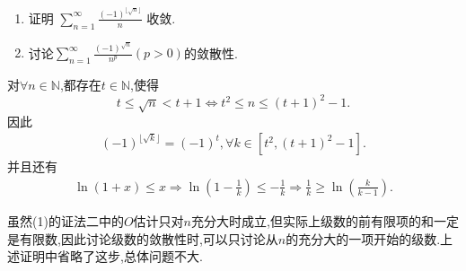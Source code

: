 \documentclass[../../main.tex]{subfiles}%
\begin{document}
\begin{example}
\begin{enumerate}[(1)]
\item 证明 $\sum_{n=1}^{\infty} \frac{(-1)^{\lfloor \sqrt{n} \rfloor}}{n}$ 收敛.

\item 讨论$\sum_{n=1}^{\infty}{\frac{\left( -1 \right) ^{\sqrt{n}}}{n^p}}\left( p>0 \right) $的敛散性.
\end{enumerate}
\end{example}
\begin{remark}
对$\forall n\in \mathbb{N}$,都存在$t\in \mathbb{N}$,使得$$t\leqslant \sqrt{n}<t+1\iff t^2\leqslant n\leqslant (t+1)^2-1.$$
因此
\begin{align*}
(-1)^{\lfloor \sqrt{k} \rfloor}=(-1)^t,\forall k\in [t^2,(t+1)^2-1].
\end{align*}
并且还有
\begin{align*}
\ln \left( 1+x \right) \leqslant x\Rightarrow \ln \left( 1-\frac{1}{k} \right) \leqslant -\frac{1}{k}\Rightarrow \frac{1}{k}\geqslant \ln \left( \frac{k}{k-1} \right) .
\end{align*}
\end{remark}
\begin{remark}
虽然(1)的证法二中的$O$估计只对$n$充分大时成立,但实际上级数的前有限项的和一定是有限数,因此讨论级数的敛散性时,可以只讨论从$n$的充分大的一项开始的级数.上述证明中省略了这步,总体问题不大.
\end{remark}
\end{document}
